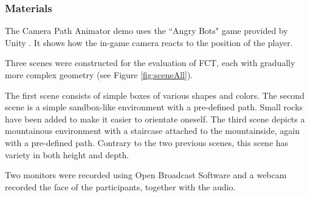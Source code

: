 \subsubsection{Materials}
The Camera Path Animator \cite{unity_camTool} demo uses the ``Angry Bots" game provided by Unity \cite{angryBots}. It shows how the in-game camera reacts to the position of the player.


Three scenes were constructed for the evaluation of FCT, each with gradually more complex geometry (see Figure \ref{fig:sceneAll}). 

The first scene consists of simple boxes of various shapes and colors.
The second scene is a simple sandbox-like environment with a pre-defined path. Small rocks have been added to make it easier to orientate oneself.
The third scene depicts a mountainous environment with a staircase attached to the mountainside, again with a pre-defined path. Contrary to the two previous scenes, this scene has variety in both height and depth.


Two monitors were recorded using Open Broadcast Software \cite{obs_cam} and a webcam recorded the face of the participants, together with the audio.

